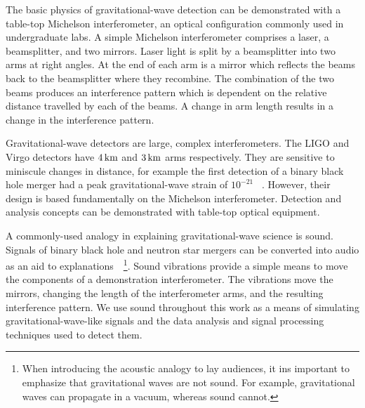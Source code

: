 \documentclass[paper-main.tex]{subfiles}
\begin{document}
The basic physics of gravitational-wave detection can be demonstrated with a table-top Michelson interferometer, an optical configuration commonly used in undergraduate labs. 
A simple Michelson interferometer comprises a laser, a beamsplitter, and two mirrors. 
Laser light is split by a beamsplitter into two arms at right angles. 
At the end of each arm is a mirror which reflects the beams back to the beamsplitter where they recombine. 
The combination of the two beams produces an interference pattern which is dependent on the relative distance travelled by each of the beams. 
A change in arm length results in a change in the interference pattern. 



Gravitational-wave detectors are large, complex interferometers.
The LIGO and Virgo detectors have $4\,{\rm km}$ and $3\,{\rm km}$ arms respectively.
They are sensitive to miniscule changes in distance, for example the first detection of a binary black hole merger had a peak gravitational-wave strain of $10^{-21}$ ~\cite{GW150914}.
However, their design is based fundamentally on the Michelson interferometer. 
Detection and analysis concepts can be demonstrated with table-top optical equipment. 
 



A commonly-used analogy in explaining gravitational-wave science is sound. 
Signals of binary black hole and neutron star mergers can be converted into audio as an aid to explanations~\cite{SoundsOfSpaceTime:online,BlackHoleHunter:online}~\footnote{When introducing the acoustic analogy to lay audiences, it ins important to emphasize that gravitational waves are not sound. For example, gravitational waves can propagate in a vacuum, whereas sound cannot.}.
Sound vibrations provide a simple means to move the components of a demonstration interferometer. 
The vibrations move the mirrors, changing the length of the interferometer arms, and the resulting interference pattern. 
We use sound throughout this work as a means of simulating gravitational-wave-like signals and the data analysis and signal processing techniques used to detect them.
\end{document}
